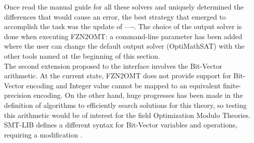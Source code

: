 Once read the manual guide for all these solvers and uniquely determined the differences that would cause an error, the best strategy that emerged to accomplish the task was the update of ----. The choice of the output solver is done when executing FZN2OMT: a command-line parameter has been added where the user can change the default output solver (OptiMathSAT) with the other tools named at the beginning of this section. \\
The second extension proposed to the interface involves the Bit-Vector arithmetic. At the current state, FZN2OMT does not provide support for Bit-Vector encoding and Integer value cannot be mapped to an equivalent finite-precision encoding. On the other hand, huge progresses has been made in the definition of algorithms to efficiently search solutions for this theory, so testing this arithmetic would be of interest for the field Optimization Modulo Theories. SMT-LIB defines a different syntax for Bit-Vector variables and operations, requiring a modification .  

\newpage
